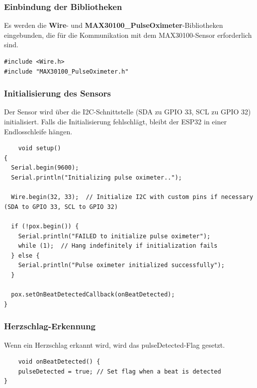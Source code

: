 \documentclass[conference,a4paper,flushend]{cs-techrep}
\begin{document}
\subsubsection{Einbindung der Bibliotheken}
Es werden die \textbf{Wire}- und \textbf{MAX30100\_PulseOximeter}-Bibliotheken eingebunden, die für die Kommunikation mit dem MAX30100-Sensor erforderlich sind.
\vspace{0.5em}
\begin{lstlisting}
#include <Wire.h>
#include "MAX30100_PulseOximeter.h"
\end{lstlisting}

\subsubsection{Initialisierung des Sensors}
Der Sensor wird über die I2C-Schnittstelle (SDA zu GPIO 33, SCL zu GPIO 32) initialisiert. Falls die Initialisierung fehlschlägt, bleibt der ESP32 in einer Endlosschleife hängen.
\vspace{0.5em}
\begin{lstlisting}
    void setup()
{
  Serial.begin(9600);
  Serial.println("Initializing pulse oximeter..");

  Wire.begin(32, 33);  // Initialize I2C with custom pins if necessary (SDA to GPIO 33, SCL to GPIO 32)

  if (!pox.begin()) {
    Serial.println("FAILED to initialize pulse oximeter");
    while (1);  // Hang indefinitely if initialization fails
  } else {
    Serial.println("Pulse oximeter initialized successfully");
  }

  pox.setOnBeatDetectedCallback(onBeatDetected);
}
\end{lstlisting}

\subsubsection{Herzschlag-Erkennung}
Wenn ein Herzschlag erkannt wird, wird das pulseDetected-Flag gesetzt.
\vspace{0.5em}
\begin{lstlisting}
    void onBeatDetected() {
    pulseDetected = true; // Set flag when a beat is detected
}
\end{lstlisting}
\end{document}
